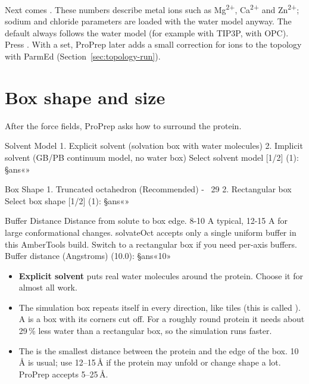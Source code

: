 Next comes . These numbers describe
metal ions such as Mg\textsuperscript{2+}, Ca\textsuperscript{2+} and
Zn\textsuperscript{2+}; sodium and chloride parameters are loaded with the
water model anyway. The default always follows the water model (for example
 with TIP3P,  with OPC). Press
. With a  set, ProPrep later adds a small correction
for ions to the topology with ParmEd (Section~\ref{sec:topology-run}).

\section{Box shape and size}\label{sec:topology-box}

After the force fields, ProPrep asks how to surround the protein.

\begin{screen}
Solvent Model
  1. Explicit solvent (solvation box with water molecules)
  2. Implicit solvent (GB/PB continuum model, no water box)
Select solvent model [1/2] (1): §ans«»

Box Shape
  1. Truncated octahedron (Recommended) - ~29%
  2. Rectangular box
Select box shape [1/2] (1): §ans«»

Buffer Distance
Distance from solute to box edge. 8-10 A typical, 12-15 A for large
conformational changes.
solvateOct accepts only a single uniform buffer in this AmberTools build.
Switch to a rectangular box if you need per-axis buffers.
Buffer distance (Angstroms) (10.0): §ans«10»
\end{screen}

\begin{itemize}
  \item \textbf{Explicit solvent} puts real water molecules around the
        protein. Choose it for almost all work.
  \item The simulation box repeats itself in every direction, like tiles
        (this is called ). A  is a box with its corners cut off. For a roughly round
        protein it needs about 29\,\% less water than a rectangular box, so
        the simulation runs faster.
  \item The  is the smallest distance between the protein and
        the edge of the box. 10\,Å is usual; use 12--15\,Å if the protein may
        unfold or change shape a lot. ProPrep accepts 5--25\,Å.
\end{itemize}

